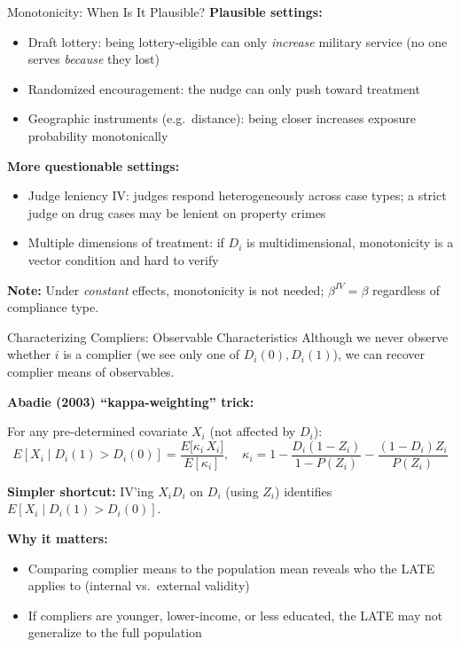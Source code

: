 \documentclass{beamer}
\begin{document}
\begin{frame}{Monotonicity: When Is It Plausible?}
\textbf{Plausible settings:}
\begin{itemize}
  \item Draft lottery: being lottery-eligible can only \emph{increase}
        military service (no one serves \emph{because} they lost)
  \item Randomized encouragement: the nudge can only push toward treatment
  \item Geographic instruments (e.g.\ distance): being closer increases
        exposure probability monotonically
\end{itemize}

\medskip
\textbf{More questionable settings:}
\begin{itemize}
  \item Judge leniency IV: judges respond heterogeneously across case types;
        a strict judge on drug cases may be lenient on property crimes
  \item Multiple dimensions of treatment: if $D_i$ is multidimensional,
        monotonicity is a vector condition and hard to verify
\end{itemize}

\medskip
\textbf{Note:} Under \emph{constant} effects, monotonicity is not needed;
$\beta^{IV}=\beta$ regardless of compliance type.
\end{frame}

\begin{frame}{Characterizing Compliers: Observable Characteristics}
Although we never observe whether $i$ is a complier (we see only one
of $D_i(0), D_i(1)$), we can recover complier means of observables.

\medskip
\textbf{Abadie (2003) ``kappa-weighting'' trick:}

For any pre-determined covariate $X_i$ (not affected by $D_i$):
\[
E[X_i\mid D_i(1)>D_i(0)]
  = \frac{E\bigl[\kappa_i\,X_i\bigr]}{E[\kappa_i]},
\quad
\kappa_i = 1 - \frac{D_i(1-Z_i)}{1-P(Z_i)}-\frac{(1-D_i)Z_i}{P(Z_i)}
\]

\textbf{Simpler shortcut:} IV'ing $X_i D_i$ on $D_i$ (using $Z_i$) identifies
$E[X_i\mid D_i(1)>D_i(0)]$.

\medskip
\textbf{Why it matters:}
\begin{itemize}
  \item Comparing complier means to the population mean reveals who the
        LATE applies to (internal vs.\ external validity)
  \item If compliers are younger, lower-income, or less educated, the
        LATE may not generalize to the full population
\end{itemize}
\end{frame}
\end{document}
